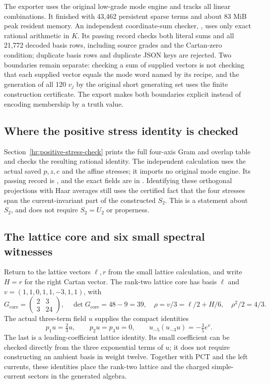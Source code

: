The exporter uses the original low-grade mode engine and tracks all
linear combinations. It finished with 43,462 persistent sparse terms
and about 83 MiB peak resident memory. An independent coordinate-sum
checker, , uses only exact
rational arithmetic in $K$. Its passing record checks both literal
sums and all 21,772 decoded basis rows, including source grades and
the Cartan-zero condition; duplicate basis rows and duplicate JSON
keys are rejected. Two boundaries remain separate:
checking a sum of supplied vectors is not checking that each
supplied vector equals the mode word named by its recipe, and the
generation of all 120 $v_j$ by the original short generating set
uses the finite construction certificate. The export makes both
boundaries explicit instead of encoding membership by a truth value.

\subsection{Where the positive stress identity is checked}

Section~\ref{hr:positive-stress-check} prints the full four-axis
Gram and overlap table and checks the resulting rational identity.
The independent calculation uses the actual saved $p,z,e$ and the
affine stresses; it imports no original mode engine. Its passing
record is ,
and the exact fields are in .
Identifying these orthogonal projections with Haar averages still
uses the certified fact that the four stresses span the
current-invariant part of the constructed $S_2$. This is a statement
about $S_2$, and does not require $S_2=U_2$ or properness.

\subsection{The lattice core and six small spectral witnesses}

Return to the lattice vectors $\ell,r$ from the small lattice
calculation, and write $H=r$ for the right Cartan vector.  The rank-two
lattice core has basis $\ell$ and $v=(1,1,0,1,1,-3,1,1)$, with
\[
 G_{\mathrm{core}}=\begin{pmatrix}2&3\\3&24\end{pmatrix},
 \quad\det G_{\mathrm{core}}=48-9=39,
 \quad \rho=v/3=\ell/2+H/6,
 \quad \rho^2/2=4/3.
\]
The actual three-term field $u$ supplies the compact identities
\[
 p_1u=\tfrac23u,\qquad p_2u=p_3u=0,
 \qquad u_{-5}(u_{-3}u)=-\tfrac35e^v.
\]
The last is a leading-coefficient lattice identity. Its small
coefficient can be checked directly from the three exponential
terms of $u$; it does not require constructing an ambient basis in
weight twelve. Together with PCT and the left currents, these
identities place the rank-two lattice and the charged simple-current
sectors in the generated algebra.

